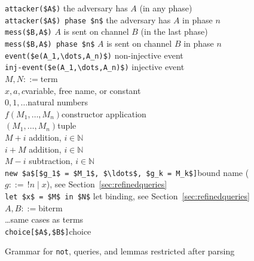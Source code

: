 \documentclass{book}
\begin{document}
\begin{figure}
\begin{center}
\begin{minipage}{\linewidth}
\begin{tabbing}
\> \lstinline!attacker($A$)! 			\>\> the adversary has $A$ (in any phase)\\
\> \lstinline!attacker($A$) phase $n$!	\>\> the adversary has $A$ in phase $n$			\\
\> \lstinline!mess($B,A$)!			\>\> $A$ is sent on channel $B$ (in the last phase)\\
\> \lstinline!mess($B,A$) phase $n$!	\>\>$A$ is sent on channel $B$ in phase $n$\\
\> \lstinline!event($e(A_1,\dots,A_n)$)!				\>\> non-injective event\\
\> \lstinline!inj-event($e(A_1,\dots,A_n)$)!			\>\> injective event\\[1.75mm]
$M,N ::=$\>\>term\\
\>$x,a,c$\>\>variable, free name, or constant\\
\>$0,1,\ldots$\>\>natural numbers\\
\>$f(M_1, \ldots, M_n)$\>\>constructor application\\
\>$(M_1, \ldots, M_n)$\>\>tuple\\
\>$M + i$\>\> addition, $i \in \mathbb{N}$\\
\>$i + M$\>\> addition, $i \in \mathbb{N}$\\
\>$M - i$\>\> subtraction, $i \in \mathbb{N}$\\
\>\lstinline!new $a$[$g_1$ = $M_1$, $\ldots$, $g_k = M_k$]!\>\>bound name ($g ::=\, !n \mid x$), see Section~\ref{sec:refinedqueries}\\
\>\lstinline!let $x$ = $M$ in $N$!\>\> let binding, see Section~\ref{sec:refinedqueries}\\[1.75mm]
$A,B ::=$\>\>biterm\\
\>\ldots\>\>same cases as terms\\
\>\lstinline!choice[$A$,$B$]!\>\>choice
\end{tabbing}
\end{minipage}
\end{center}

\caption{Grammar for \texttt{not}, queries, and lemmas restricted after parsing}
\label{fig:restricted grammar query}
\end{figure}




\newpage
\end{document}
